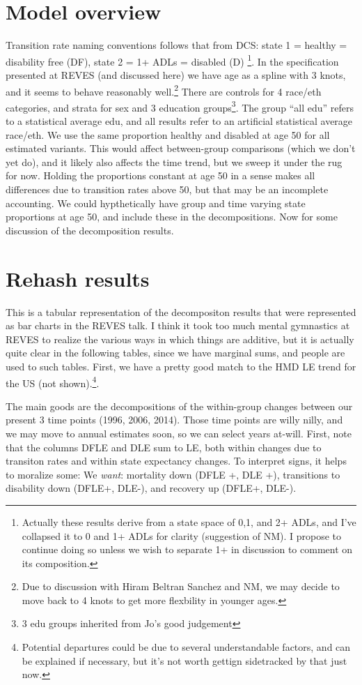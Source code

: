 \section{Model overview}
Transition rate naming conventions follows that from DCS: state 1 = healthy = disability free (DF), state 2 = 1+ ADLs = disabled (D) \footnote{Actually these results derive from a state space of 0,1, and 2+ ADLs, and I've collapsed it to 0 and 1+ ADLs for clarity (suggestion of NM). I propose to continue doing so unless we wish to separate 1+ in discussion to comment on its composition.}. In the specification presented at REVES (and discussed here) we have age as a spline with 3 knots, and it seems to behave reasonably well.\footnote{Due to discussion with Hiram Beltran Sanchez and NM, we may decide to move back to 4 knots to get more flexbility in younger ages.} There are controls for 4 race/eth categories, and strata for sex and 3 education groups\footnote{3 edu groups inherited from Jo's good judgement}. The group ``all edu'' refers to a statistical average edu, and all results refer to an artificial statistical average race/eth. We use the same proportion healthy and disabled at age 50 for all estimated variants. This would affect between-group comparisons (which we don't yet do), and it likely also affects the time trend, but we sweep it under the rug for now. Holding the proportions constant at age 50 in a sense makes all differences due to transition rates above 50, but that may be an incomplete accounting. We could hypthetically have group and time varying state proportions at age 50, and include these in the decompositions. Now for some discussion of the decomposition results.

\section{Rehash results}
This is a tabular representation of the decompositon results that were represented as bar charts in the REVES talk. I think it took too much mental gymnastics at REVES to realize the various ways in which things are additive, but it is actually quite clear in the following tables, since we have marginal sums, and people are used to such tables. First, we have a pretty good match to the HMD LE trend for the US (not shown).\footnote{Potential departures could be due to several understandable factors, and can be explained if necessary, but it's not worth gettign sidetracked by that just now.}. 

The main goods are the decompositions of the within-group changes between our present 3 time points (1996, 2006, 2014). Those time points are willy nilly, and we may move to annual estimates soon, so we can select years at-will. First, note that the columns DFLE and DLE sum to LE, both within changes due to transiton rates and within state expectancy changes. To interpret signs, it helps to moralize some: We \emph{want}: mortality down (DFLE +, DLE +), transitions to disability down (DFLE+, DLE-), and recovery up (DFLE+, DLE-).

